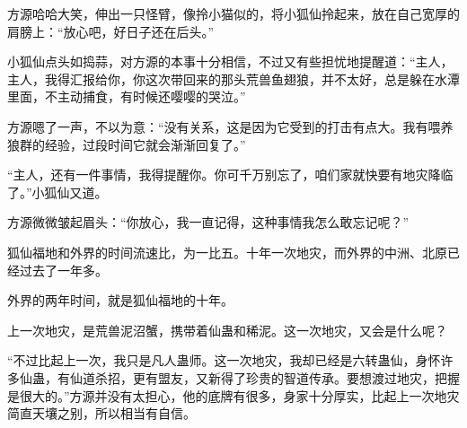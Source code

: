 \begin{this_body}
方源哈哈大笑，伸出一只怪臂，像拎小猫似的，将小狐仙拎起来，放在自己宽厚的肩膀上：“放心吧，好日子还在后头。”

小狐仙点头如捣蒜，对方源的本事十分相信，不过又有些担忧地提醒道：“主人，主人，我得汇报给你，你这次带回来的那头荒兽鱼翅狼，并不太好，总是躲在水潭里面，不主动捕食，有时候还嘤嘤的哭泣。”

方源嗯了一声，不以为意：“没有关系，这是因为它受到的打击有点大。我有喂养狼群的经验，过段时间它就会渐渐回复了。”

“主人，还有一件事情，我得提醒你。你可千万别忘了，咱们家就快要有地灾降临了。”小狐仙又道。

方源微微皱起眉头：“你放心，我一直记得，这种事情我怎么敢忘记呢？”

狐仙福地和外界的时间流速比，为一比五。十年一次地灾，而外界的中洲、北原已经过去了一年多。

外界的两年时间，就是狐仙福地的十年。

上一次地灾，是荒兽泥沼蟹，携带着仙蛊和稀泥。这一次地灾，又会是什么呢？

“不过比起上一次，我只是凡人蛊师。这一次地灾，我却已经是六转蛊仙，身怀许多仙蛊，有仙道杀招，更有盟友，又新得了珍贵的智道传承。要想渡过地灾，把握是很大的。”方源并没有太担心，他的底牌有很多，身家十分厚实，比起上一次地灾简直天壤之别，所以相当有自信。

\end{this_body}

